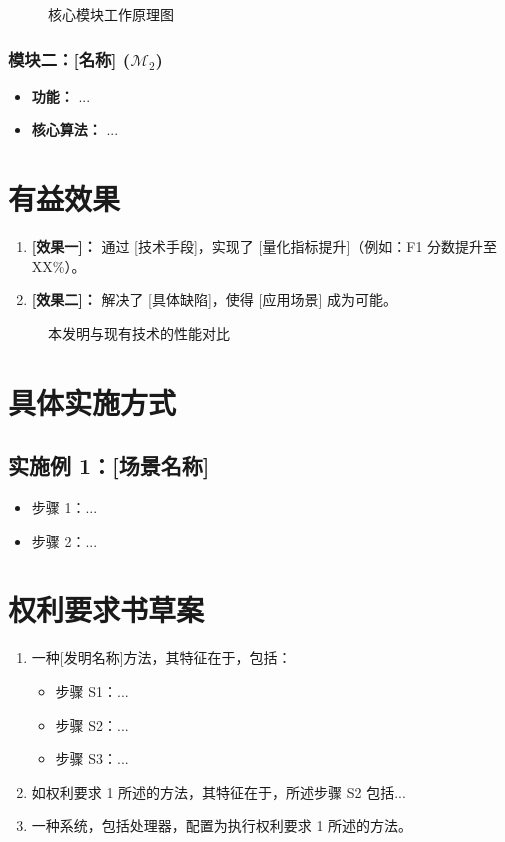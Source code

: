 \documentclass[a4paper,12pt]{article}
\begin{document}
\begin{figure}[H]
    \centering
    \caption{核心模块工作原理图}
    \label{fig:module1}
\end{figure}

\subsubsection{模块二：[名称] ($\mathcal{M}_2$)}
\begin{itemize}
    \item \textbf{功能：} ...
    \item \textbf{核心算法：} ...
\end{itemize}

\section{有益效果}

\begin{enumerate}
    \item \textbf{[效果一]：}
    通过 [技术手段]，实现了 [量化指标提升]（例如：F1 分数提升至 XX\%）。
    
    \item \textbf{[效果二]：}
    解决了 [具体缺陷]，使得 [应用场景] 成为可能。
\end{enumerate}

\begin{figure}[H]
    \centering
    \caption{本发明与现有技术的性能对比}
    \label{fig:performance}
\end{figure}

\section{具体实施方式}

\subsection{实施例 1：[场景名称]}
\begin{itemize}
    \item 步骤 1：...
    \item 步骤 2：...
\end{itemize}

\section{权利要求书草案}

\begin{enumerate}
    \item 一种[发明名称]方法，其特征在于，包括：
    \begin{itemize}
        \item 步骤 S1：...
        \item 步骤 S2：...
        \item 步骤 S3：...
    \end{itemize}
    \item 如权利要求 1 所述的方法，其特征在于，所述步骤 S2 包括...
    \item 一种系统，包括处理器，配置为执行权利要求 1 所述的方法。
\end{enumerate}
\end{document}
